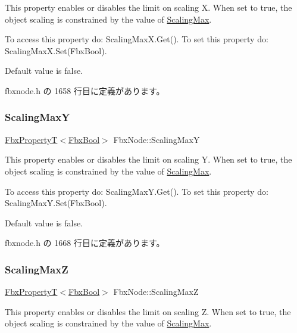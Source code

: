 This property enables or disables the limit on scaling X. When set to {\ttfamily true}, the object scaling is constrained by the value of \hyperlink{class_fbx_node_a530a22a286aa932f665abfa1bbda2ea8}{Scaling\+Max}.

To access this property do\+: Scaling\+Max\+X.\+Get(). To set this property do\+: Scaling\+Max\+X.\+Set(\+Fbx\+Bool).

Default value is false. 

 fbxnode.\+h の 1658 行目に定義があります。

\mbox{\label{class_fbx_node_a6a515f87577f63a57a7fe8a6c971d9ad}} 
\subsubsection{\texorpdfstring{Scaling\+MaxY}{ScalingMaxY}}
{\footnotesize\ttfamily \hyperlink{class_fbx_property_t}{Fbx\+PropertyT}$<$\hyperlink{fbxtypes_8h_a92e0562b2fe33e76a242f498b362262e}{Fbx\+Bool}$>$ Fbx\+Node\+::\+Scaling\+MaxY}

This property enables or disables the limit on scaling Y. When set to {\ttfamily true}, the object scaling is constrained by the value of \hyperlink{class_fbx_node_a530a22a286aa932f665abfa1bbda2ea8}{Scaling\+Max}.

To access this property do\+: Scaling\+Max\+Y.\+Get(). To set this property do\+: Scaling\+Max\+Y.\+Set(\+Fbx\+Bool).

Default value is false. 

 fbxnode.\+h の 1668 行目に定義があります。

\mbox{\label{class_fbx_node_af4c72a83f64207cbcad432a5f48432af}} 
\subsubsection{\texorpdfstring{Scaling\+MaxZ}{ScalingMaxZ}}
{\footnotesize\ttfamily \hyperlink{class_fbx_property_t}{Fbx\+PropertyT}$<$\hyperlink{fbxtypes_8h_a92e0562b2fe33e76a242f498b362262e}{Fbx\+Bool}$>$ Fbx\+Node\+::\+Scaling\+MaxZ}

This property enables or disables the limit on scaling Z. When set to {\ttfamily true}, the object scaling is constrained by the value of \hyperlink{class_fbx_node_a530a22a286aa932f665abfa1bbda2ea8}{Scaling\+Max}.

